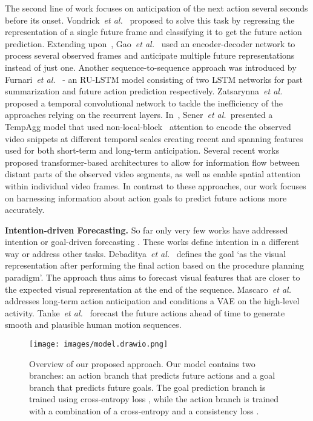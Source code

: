 \documentclass{article}
\newcommand{\etal}[1]{\textit{et al}\onedot}
\def\etal{\emph{et al.}}
\begin{document}
The second line of work focuses on anticipation of the next action several seconds before its onset. Vondrick~\etal~\cite{Vondrick_2016_CVPR} proposed to solve this task by regressing the representation of a single future frame and classifying it to get the future action prediction. Extending upon~\cite{Vondrick_2016_CVPR}, Gao~\etal~\cite{Gao_2017_BMVC} used an encoder-decoder network to process several observed frames and anticipate multiple future representations instead of just one. Another sequence-to-sequence approach was introduced by Furnari~\etal~\cite{furnari2020rulstm} - an RU-LSTM model consisting of two LSTM networks for past summarization and future action prediction respectively. Zatsarynna~\etal~\cite{zatsarynna2021MMTCN} proposed a temporal convolutional network to tackle the inefficiency of the approaches relying on the recurrent layers. In~\cite{sener2020temporal}, Sener~\etal\ presented a TempAgg model that used non-local-block~\cite{Wang2017NonlocalNN} attention to encode the observed video snippets at different temporal scales creating recent and spanning features used for both short-term and long-term anticipation. Several recent works~\cite{zhao2022testra, girdhar2021anticipative, memvit2022} proposed transformer-based architectures to allow for information flow between distant parts of the observed video segments, as well as enable spatial attention within individual video frames. In contrast to these approaches, our work focuses on harnessing information about action goals to predict future actions more accurately.

\textbf{Intention-driven Forecasting.} So far only very few works have addressed intention or goal-driven forecasting \cite{tanke2021intention,Mascaro_2023_WACV,debaditya2022latent}. These works define intention in a different way or address other tasks. Debaditya~\etal~\cite{debaditya2022latent} defines the goal `as the visual representation after performing the final action based on the procedure planning paradigm'. The approach thus aims to forecast visual features that are closer to the expected visual representation at the end of the sequence. Mascaro~\etal~\cite{Mascaro_2023_WACV} addresses long-term action anticipation and conditions a VAE on the high-level activity. Tanke~\etal~\cite{tanke2021intention} forecast the future actions ahead of time to generate smooth and plausible human motion sequences. 





\begin{figure}[h!]
\begin{minipage}[b]{0.5\textwidth}
  \centering
  \texttt{[image: images/model.drawio.png]}
\end{minipage}
\caption{\small Overview of our proposed approach. Our model contains two branches: an action branch that predicts future actions and a goal branch that predicts future goals. The goal prediction branch is trained using cross-entropy loss , while the action branch is trained with a combination of a cross-entropy  and a consistency loss .}
\label{fig:model}
\vspace{-0.3cm}
\end{figure}
\end{document}
